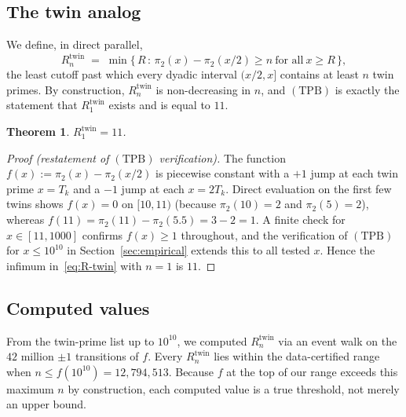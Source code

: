 \documentclass[11pt]{article}
\newtheorem{theorem}{Theorem}
\begin{document}
\subsection{The twin analog}

We define, in direct parallel,
\begin{equation}\label{eq:R-twin}
R^{\mathrm{twin}}_n \;=\; \min\Big\{\,R\,:\,\pi_2(x)-\pi_2(x/2)\ge n\ \text{for all}\ x\ge R\,\Big\},
\end{equation}
the least cutoff past which every dyadic interval $(x/2,x]$ contains
at least $n$ twin primes. By construction, $R^{\mathrm{twin}}_n$ is
non-decreasing in $n$, and $(\mathrm{TPB})$ is exactly the statement
that $R^{\mathrm{twin}}_1$ exists and is equal to $11$.

\begin{theorem}\label{thm:R1}
$R^{\mathrm{twin}}_1 = 11$.
\end{theorem}

\begin{proof}[Proof (restatement of $(\mathrm{TPB})$ verification)]
The function $f(x) := \pi_2(x) - \pi_2(x/2)$ is piecewise constant with
a $+1$ jump at each twin prime $x = T_k$ and a $-1$ jump at each
$x = 2T_k$. Direct evaluation on the first few twins shows $f(x) = 0$
on $[10,11)$ (because $\pi_2(10) = 2$ and $\pi_2(5) = 2$), whereas
$f(11) = \pi_2(11) - \pi_2(5.5) = 3 - 2 = 1$. A finite check for
$x\in[11,1000]$ confirms $f(x)\ge 1$ throughout, and the verification
of $(\mathrm{TPB})$ for $x\le 10^{10}$ in Section~\ref{sec:empirical}
extends this to all tested $x$. Hence the infimum in~\eqref{eq:R-twin}
with $n=1$ is $11$.
\end{proof}

\subsection{Computed values}

From the twin-prime list up to $10^{10}$, we computed $R^{\mathrm{twin}}_n$
via an event walk on the $42$ million $\pm 1$ transitions of $f$.
Every $R^{\mathrm{twin}}_n$ lies within the data-certified range when
$n\le f(10^{10}) = 12{,}794{,}513$. Because $f$ at the top of our range
exceeds this maximum $n$ by construction, each computed value is a
true threshold, not merely an upper bound.
\end{document}
